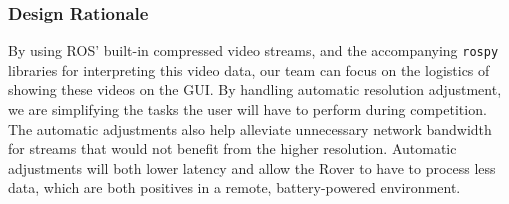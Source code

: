 \subsubsection{Design Rationale}
By using ROS' built-in compressed video streams, and the accompanying \texttt{rospy} libraries for interpreting this video data, our team can focus on the logistics of showing these videos on the GUI.
By handling automatic resolution adjustment, we are simplifying the tasks the user will have to perform during competition.
The automatic adjustments also help alleviate unnecessary network bandwidth for streams that would not benefit from the higher resolution. 
Automatic adjustments will both lower latency and allow the Rover to have to process less data, which are both positives in a remote, battery-powered environment.
